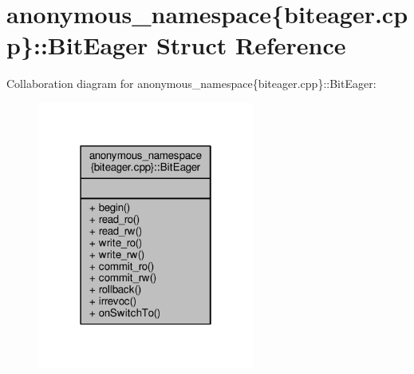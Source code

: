 \hypertarget{structanonymous__namespace_02biteager_8cpp_03_1_1BitEager}{\section{anonymous\-\_\-namespace\{biteager.\-cpp\}\-:\-:Bit\-Eager Struct Reference}
\label{structanonymous__namespace_02biteager_8cpp_03_1_1BitEager}
}


Collaboration diagram for anonymous\-\_\-namespace\{biteager.\-cpp\}\-:\-:Bit\-Eager\-:
\nopagebreak
\begin{figure}[H]
\begin{center}
\leavevmode
\includegraphics[width=202pt]{structanonymous__namespace_02biteager_8cpp_03_1_1BitEager__coll__graph}
\end{center}
\end{figure}
